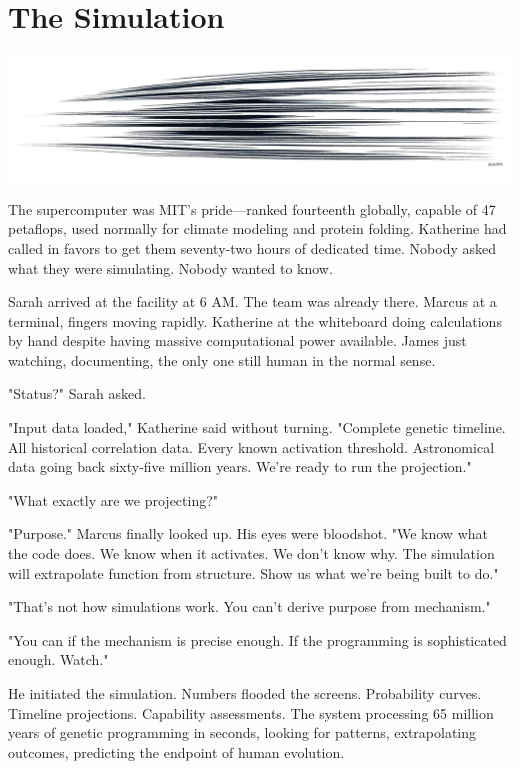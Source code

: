 \chapter{The Simulation}
\label{ch:21}



\begin{center}
\includegraphics[width=\textwidth]{images/chapterImages/genesis_sketch_00118_.png}
\end{center}

The supercomputer was MIT's pride—ranked fourteenth globally, capable of 47 petaflops, used normally for climate modeling and protein folding. Katherine had called in favors to get them seventy-two hours of dedicated time. Nobody asked what they were simulating. Nobody wanted to know.

Sarah arrived at the facility at 6 AM. The team was already there. Marcus at a terminal, fingers moving rapidly. Katherine at the whiteboard doing calculations by hand despite having massive computational power available. James just watching, documenting, the only one still human in the normal sense.

"Status?" Sarah asked.

"Input data loaded," Katherine said without turning. "Complete genetic timeline. All historical correlation data. Every known activation threshold. Astronomical data going back sixty-five million years. We're ready to run the projection."

"What exactly are we projecting?"

"Purpose." Marcus finally looked up. His eyes were bloodshot. "We know what the code does. We know when it activates. We don't know why. The simulation will extrapolate function from structure. Show us what we're being built to do."

"That's not how simulations work. You can't derive purpose from mechanism."

"You can if the mechanism is precise enough. If the programming is sophisticated enough. Watch."

He initiated the simulation. Numbers flooded the screens. Probability curves. Timeline projections. Capability assessments. The system processing 65 million years of genetic programming in seconds, looking for patterns, extrapolating outcomes, predicting the endpoint of human evolution.

